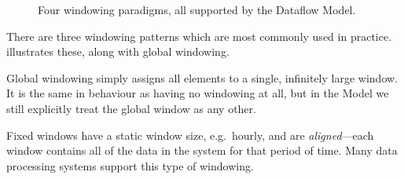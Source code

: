 \begin{figure}[t]
	\caption{Four windowing paradigms, all supported by the Dataflow Model.}
	\label{fig:prep:window-types}
\end{figure}

There are three windowing patterns which are most commonly used in practice.
 illustrates these, along with global windowing.

Global windowing simply assigns all elements to a single, infinitely large window.
It is the same in behaviour as having no windowing at all, but in the Model we still explicitly treat the global window as any other.

Fixed windows have a static window size, e.g.\ hourly, and are \emph{aligned}---each window contains all of the data in the system for that period of time.
Many data processing systems support this type of windowing.


